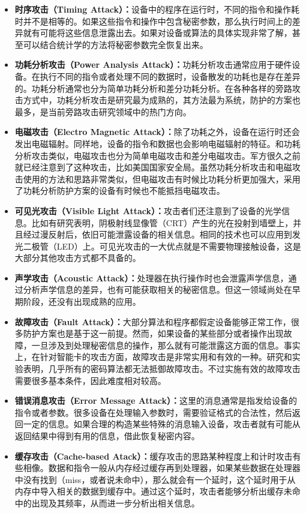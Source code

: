 \begin{itemize}
\item \textbf{时序攻击（Timing Attack）：}设备中的程序在运行时，不同的指令和操作耗时并不是相等的。如果这些指令和操作中包含秘密参数，那么执行时间上的差异就有可能将这些信息泄露出去。如果对设备或算法的具体实现非常了解，甚至可以结合统计学的方法将秘密参数完全恢复出来。
\item \textbf{功耗分析攻击（Power Analysis Attack）：}功耗分析攻击通常应用于硬件设备。在执行不同的指令或者处理不同的数据时，设备散发的功耗也是存在差异的。功耗分析通常也分为简单功耗分析和差分功耗分析。在各种各样的旁路攻击方式中，功耗分析攻击是研究最为成熟的，其方法最为系统，防护的方案也最多，是当前旁路攻击研究领域中的热门方向。
\item \textbf{电磁攻击（Electro Magnetic Attack）：}除了功耗之外，设备在运行时还会发出电磁辐射。同样地，设备的指令和数据也会影响电磁辐射的特征。和功耗分析攻击类似，电磁攻击也分为简单电磁攻击和差分电磁攻击。军方很久之前就已经注意到了这种攻击，比如美国国家安全局。虽然功耗分析攻击和电磁攻击使用的方法和思路非常类似，但电磁攻击有时候比功耗分析更加强大，采用了功耗分析防护方案的设备有时候也不能抵挡电磁攻击。
\item \textbf{可见光攻击（Visible Light Attack）：}攻击者们还注意到了设备的光学信息。比如有研究表明，阴极射线显像管（CRT）产生的光在投射到墙壁上，并且经过漫反射后，依旧可能泄露设备的相关信息。相同的技术也可以应用到发光二极管（LED）上。可见光攻击的一大优点就是不需要物理接触设备，这是大部分其他攻击方式都不具备的。
\item \textbf{声学攻击（Acoustic Attack）：}处理器在执行操作时也会泄露声学信息，通过分析声学信息的差异，也有可能获取相关的秘密信息。但这一领域尚处在早期阶段，还没有出现成熟的应用。
\item \textbf{故障攻击（Fault Attack）：}大部分算法和程序都假定设备能够正常工作，很多防护方案也是基于这一前提。然而，如果设备的某些部分或者操作出现故障，一旦涉及到处理秘密信息的操作，那么就有可能泄露这方面的信息。事实上，在针对智能卡的攻击方面，故障攻击是非常实用和有效的一种。研究和实验表明，几乎所有的密码算法都无法抵御故障攻击。不过实施有效的故障攻击需要很多基本条件，因此难度相对较高。
\item \textbf{错误消息攻击（Error Message Attack）：}这里的消息通常是指发给设备的指令或者参数。很多设备在处理输入参数时，需要验证格式的合法性，然后返回一定的信息。如果合理的构造某些特殊的消息输入设备，攻击者就有可能从返回结果中得到有用的信息，借此恢复秘密内容。
\item \textbf{缓存攻击（Cache-based Atack）：}缓存攻击的思路某种程度上和计时攻击有些相像。数据和指令一般从内存经过缓存再到处理器，如果某些数据在处理器中没有找到（miss，或者说未命中），那么就会有一个延时，这个延时用于从内存中导入相关的数据到缓存中。通过这个延时，攻击者能够分析出缓存未命中的出现及其频率，从而进一步分析出相关信息。

\end{itemize}
